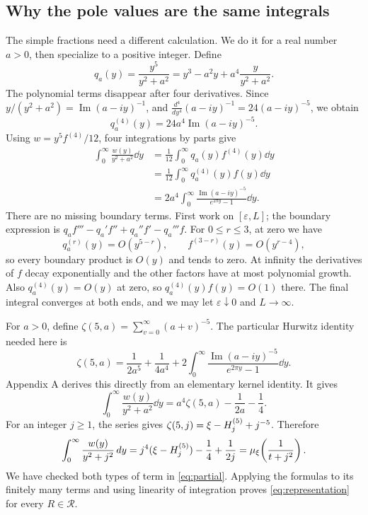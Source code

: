 \subsection{Why the pole values are the same integrals}
The simple fractions need a different calculation. We do it for a real
number $a>0$, then specialize to a positive integer. Define
\[
 q_a(y)=\frac{y^5}{y^2+a^2}
       =y^3-a^2y+a^4\frac{y}{y^2+a^2}.
\]
The polynomial terms disappear after four derivatives. Since
$y/(y^2+a^2)=\operatorname{Im}(a-iy)^{-1}$, and
$\frac{d^4}{dy^4}(a-iy)^{-1}=24(a-iy)^{-5}$, we obtain
\[
 q_a^{(4)}(y)=24a^4\operatorname{Im}(a-iy)^{-5}.
\]
Using $w=y^5f^{(4)}/12$, four integrations by parts give
\begin{align*}
 \int_0^\infty\frac{w(y)}{y^2+a^2}\dd y
 &=\frac1{12}\int_0^\infty q_a(y)f^{(4)}(y)\dd y\\
 &=\frac1{12}\int_0^\infty q_a^{(4)}(y)f(y)\dd y\\
 &=2a^4\int_0^\infty
     \frac{\operatorname{Im}(a-iy)^{-5}}{e^{2\pi y}-1}\dd y.
\end{align*}
There are no missing boundary terms. First work on $[\varepsilon,L]$;
the boundary expression is
$q_af'''-q_a'f''+q_a''f'-q_a'''f$.
For $0\leq r\leq3$, at zero we have
\[
 q_a^{(r)}(y)=O(y^{5-r}),\qquad
 f^{(3-r)}(y)=O(y^{r-4}),
\]
so every boundary product is $O(y)$ and tends to zero. At infinity the
derivatives of $f$ decay exponentially and the other factors have at most
polynomial growth. Also $q_a^{(4)}(y)=O(y)$ at zero, so
$q_a^{(4)}(y)f(y)=O(1)$ there. The final integral converges at both ends,
and we may let $\varepsilon\downarrow0$ and $L\to\infty$.

For $a>0$, define $\zeta(5,a)=\sum_{v=0}^\infty(a+v)^{-5}$.
The particular Hurwitz identity needed here is
\begin{equation}\label{eq:hermite}
 \zeta(5,a)=\frac1{2a^5}+\frac1{4a^4}
 +2\int_0^\infty
     \frac{\operatorname{Im}(a-iy)^{-5}}{e^{2\pi y}-1}\dd y.
\end{equation}
Appendix A derives this directly from an elementary kernel identity.
It gives
\[
 \int_0^\infty\frac{w(y)}{y^2+a^2}\dd y
 =a^4\zeta(5,a)-\frac1{2a}-\frac14.
\]
For an integer $j\geq1$, the series gives
$\zeta(5,j)=\xi-H_{j}^{(5)}+j^{-5}$. Therefore
\[
 \int_0^\infty\frac{w(y)}{y^2+j^2}\,d y
 =j^4(\xi-H_{j}^{(5)})-\frac14+\frac1{2j}
 =\mu_\xi\!\left(\frac1{t+j^2}\right).
\]
We have checked both types of term in \eqref{eq:partial}.
Applying the formulas to its finitely many terms and using linearity
of integration proves \eqref{eq:representation} for every $R\in\mathcal R$.

